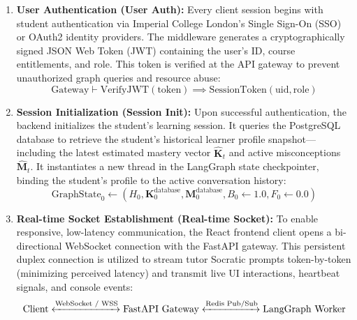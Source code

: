 \documentclass[11pt,a4paper]{report}
\begin{document}
\begin{enumerate}
    \item \textbf{User Authentication (User Auth):} Every client session begins with student authentication via Imperial College London's Single Sign-On (SSO) or OAuth2 identity providers. The middleware generates a cryptographically signed JSON Web Token (JWT) containing the user's ID, course entitlements, and role. This token is verified at the API gateway to prevent unauthorized graph queries and resource abuse:
    \begin{equation}
        \text{Gateway} \vdash \text{VerifyJWT}(\text{token}) \implies \text{SessionToken}(\text{uid}, \text{role})
    \end{equation}
    
    \item \textbf{Session Initialization (Session Init):} Upon successful authentication, the backend initializes the student's learning session. It queries the PostgreSQL database to retrieve the student's historical learner profile snapshot---including the latest estimated mastery vector $\hat{\mathbf{K}}_t$ and active misconceptions $\hat{\mathbf{M}}_t$. It instantiates a new thread in the LangGraph state checkpointer, binding the student's profile to the active conversation history:
    \begin{equation}
        \text{GraphState}_0 \gets \left( H_0, \mathbf{K}_0^{\text{database}}, \mathbf{M}_0^{\text{database}}, B_0 \gets 1.0, F_0 \gets 0.0 \right)
    \end{equation}
    
    \item \textbf{Real-time Socket Establishment (Real-time Socket):} To enable responsive, low-latency communication, the React frontend client opens a bi-directional WebSocket connection with the FastAPI gateway. This persistent duplex connection is utilized to stream tutor Socratic prompts token-by-token (minimizing perceived latency) and transmit live UI interactions, heartbeat signals, and console events:
    \begin{equation}
        \text{Client} \xleftrightarrow{\text{WebSocket / WSS}} \text{FastAPI Gateway} \xleftrightarrow{\text{Redis Pub/Sub}} \text{LangGraph Worker}
    \end{equation}
    

\end{enumerate}
\end{document}
